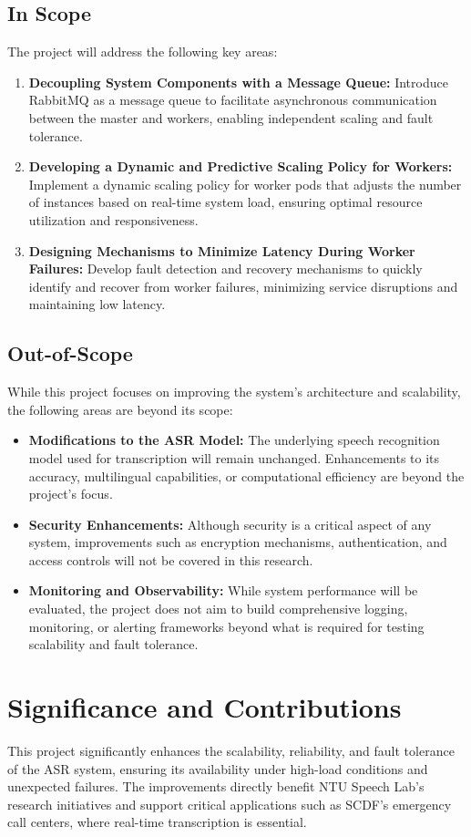 \subsection{In Scope}
The project will address the following key areas:
\begin{enumerate}
    \item \textbf{Decoupling System Components with a Message Queue:} Introduce RabbitMQ as a message queue to facilitate asynchronous communication between the master and workers, enabling independent scaling and fault tolerance.
    \item \textbf{Developing a Dynamic and Predictive Scaling Policy for Workers:} Implement a dynamic scaling policy for worker pods that adjusts the number of instances based on real-time system load, ensuring optimal resource utilization and responsiveness.
    \item \textbf{Designing Mechanisms to Minimize Latency During Worker Failures:} Develop fault detection and recovery mechanisms to quickly identify and recover from worker failures, minimizing service disruptions and maintaining low latency.
\end{enumerate}

\subsection{Out-of-Scope}
While this project focuses on improving the system’s architecture and scalability, the following areas are beyond its scope:
\begin{itemize}
    \item \textbf{Modifications to the ASR Model:} The underlying speech recognition model used for transcription will remain unchanged. Enhancements to its accuracy, multilingual capabilities, or computational efficiency are beyond the project's focus.
    \item \textbf{Security Enhancements:} Although security is a critical aspect of any system, improvements such as encryption mechanisms, authentication, and access controls will not be covered in this research.
    \item \textbf{Monitoring and Observability:} While system performance will be evaluated, the project does not aim to build comprehensive logging, monitoring, or alerting frameworks beyond what is required for testing scalability and fault tolerance.
\end{itemize}

\section{Significance and Contributions}
This project significantly enhances the scalability, reliability, and fault tolerance of the ASR system, ensuring its availability under high-load conditions and unexpected failures. The improvements directly benefit NTU Speech Lab’s research initiatives and support critical applications such as SCDF’s emergency call centers, where real-time transcription is essential. 

